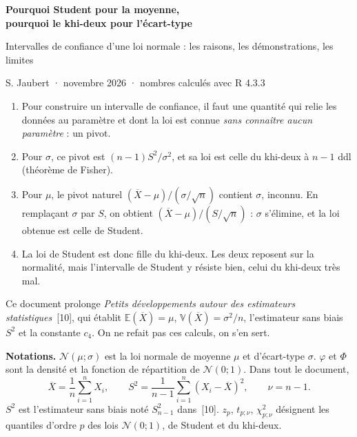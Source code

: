 \documentclass[11pt,a4paper]{article}
\theoremstyle{sj}
\theoremstyle{definition}
\theoremstyle{remark}
\newcommand{\E}{\mathbb{E}}
\newcommand{\V}{\mathbb{V}}
\newcommand{\N}{\mathcal{N}}
\newcommand{\Xb}{\overline{X}}
\newcommand{\chid}{\chi^2}
\begin{document}
{\raggedright\Huge\bfseries\color{bleu} Pourquoi Student pour la moyenne,\\[4pt] pourquoi le khi-deux pour l'écart-type\par}
\medskip
{\large Intervalles de confiance d'une loi normale : les raisons, les démonstrations, les limites\par}
\medskip
{\small S. Jaubert · novembre 2026 · nombres calculés avec R 4.3.3\par}

\bigskip
\begin{essentiel}
\begin{enumerate}[leftmargin=1.4em,itemsep=1pt]
\item Pour construire un intervalle de confiance, il faut une quantité qui relie les données au paramètre et dont la loi est connue \emph{sans connaître aucun paramètre} : un pivot.
\item Pour $\sigma$, ce pivot est $(n-1)S^2/\sigma^2$, et sa loi est celle du khi-deux à $n-1$ ddl (théorème de Fisher).
\item Pour $\mu$, le pivot naturel $(\Xb-\mu)/(\sigma/\sqrt n)$ contient $\sigma$, inconnu. En remplaçant $\sigma$ par $S$, on obtient $(\Xb-\mu)/(S/\sqrt n)$ : $\sigma$ s'élimine, et la loi obtenue est celle de Student.
\item La loi de Student est donc fille du khi-deux. Les deux reposent sur la normalité, mais l'intervalle de Student y résiste bien, celui du khi-deux très mal.
\end{enumerate}
\end{essentiel}

Ce document prolonge \emph{Petits développements autour des estimateurs statistiques}~[10], qui établit $\E(\Xb)=\mu$, $\V(\Xb)=\sigma^2/n$, l'estimateur sans biais $S^2$ et la constante $c_4$. On ne refait pas ces calculs, on s'en sert.

\textbf{Notations.} $\N(\mu;\sigma)$ est la loi normale de moyenne $\mu$ et d'écart-type $\sigma$. $\varphi$ et $\Phi$ sont la densité et la fonction de répartition de $\N(0;1)$. Dans tout le document,
\[
\Xb=\frac1n\sum_{i=1}^nX_i,\qquad S^2=\frac{1}{n-1}\sum_{i=1}^n(X_i-\Xb)^2,\qquad \nu=n-1.
\]
$S^2$ est l'estimateur sans biais noté $S^2_{n-1}$ dans~[10]. $z_p$, $t_{p;\nu}$, $\chid_{p;\nu}$ désignent les quantiles d'ordre $p$ des lois $\N(0;1)$, de Student et du khi-deux.

\tableofcontents
\clearpage

\end{document}
